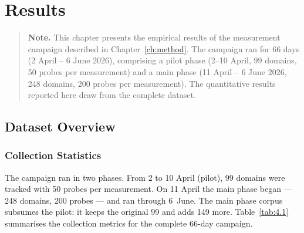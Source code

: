 \chapter{Results}
\label{ch:results}

\begin{quote}
\textbf{Note.} This chapter presents the empirical results of the measurement campaign described in Chapter~\ref{ch:method}. The campaign ran for 66 days (2 April -- 6 June 2026), comprising a pilot phase (2--10 April, 99 domains, 50 probes per measurement) and a main phase (11 April -- 6 June 2026, 248 domains, 200 probes per measurement). The quantitative results reported here draw from the complete dataset.
\end{quote}

\bigskip
\section{Dataset Overview}
\label{sec:4.1}

\subsection{Collection Statistics}
\label{subsec:4.1.1}

The campaign ran in two phases. From 2 to 10 April (pilot), 99 domains were tracked with 50 probes per measurement. On 11 April the main phase began --- 248 domains, 200 probes --- and ran through 6~June. The main phase corpus subsumes the pilot: it keeps the original 99 and adds 149 more. Table~\ref{tab:4.1} summarises the collection metrics for the complete 66-day campaign.

